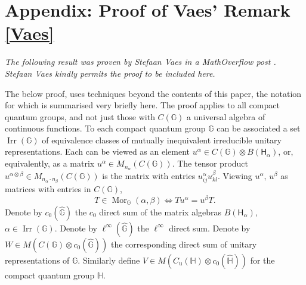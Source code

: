 \documentclass[12pt]{amsart}
\theoremstyle{remark}
\theoremstyle{remark}
\begin{document}
\section*{Appendix: Proof of Vaes' Remark \ref{Vaes}}
\emph{The following result was proven by Stefaan Vaes in a MathOverflow post \cite{Vaes}. Stefaan Vaes kindly permits the proof to be included here.}


\bigskip

The below proof, uses techniques beyond the contents of this paper, the notation for which is summarised very briefly here. The proof applies to all compact quantum groups, and not just those with $C(\mathbb{G})$ a universal algebra of continuous functions. To each compact quantum group $\mathbb{G}$ can be associated a set $\operatorname{Irr}(\mathbb{G})$ of equivalence classes of mutually inequivalent irreducible unitary representations. Each can be viewed as an element $u^\alpha\in C(\mathbb{G})\otimes B(\mathsf{H}_\alpha)$, or, equivalently, as a matrix $u^\alpha\in M_{n_\alpha}(C(\mathbb{G}))$. The tensor product $u^{\alpha\otimes \beta}\in M_{n_\alpha\cdot n_\beta}(C(\mathbb{G}))$ is the matrix with entries $u^\alpha_{ij}u^\beta_{kl}$. Viewing $u^\alpha,\,u^\beta$ as matrices with entries in $C(\mathbb{G})$,
$$T\in \operatorname{Mor}_{\mathbb{G}}(\alpha,\beta)\iff Tu^\alpha=u^\beta T.$$  Denote by $c_0(\widehat{\mathbb{G}})$ the $c_0$ direct sum of the matrix algebras $B(\mathsf{H}_\alpha)$, $\alpha \in \operatorname{Irr}(\mathbb{G})$. Denote by $\ell^\infty(\widehat{\mathbb{G}})$ the $\ell^\infty$ direct sum. Denote by $W \in M(C(\mathbb{G}) \otimes c_0(\widehat{\mathbb{G}}))$ the corresponding direct sum of unitary representations of $\mathbb{G}$. Similarly define $V \in M(C_{\text{u}}(\mathbb{H}) \otimes c_0(\widehat{\mathbb{H}}))$ for the compact quantum group $\mathbb{H}$.
\end{document}
